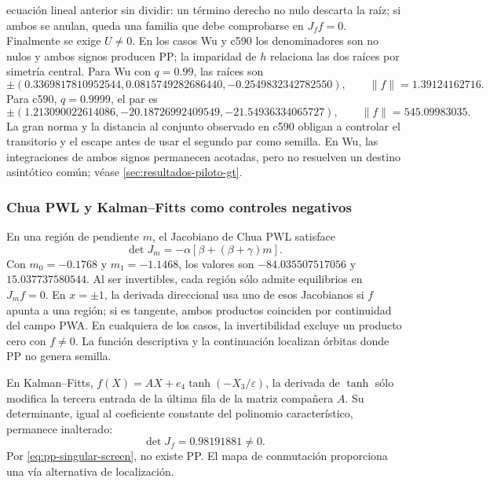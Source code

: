 ecuación lineal anterior sin dividir: un término derecho no nulo descarta
la raíz; si ambos se anulan, queda una familia que debe comprobarse en
\(J_ff=0\). Finalmente se exige \(U\ne0\). En los casos Wu y c590 los
denominadores son no nulos y ambos signos producen PP; la imparidad de
\(h\) relaciona las dos raíces por simetría central.
Para Wu con \(q=0.99\), las raíces son
\begin{equation}
 \pm(0.3369817810952544, 0.0815749282686440,
 -0.2549832342782550),\qquad \|f\|=1.39124162716.
\end{equation}
Para c590, \(q=0.9999\), el par es
\begin{equation}
 \pm(1.213090022614086, -20.18726992409549,
 -21.54936334065727),\qquad \|f\|=545.09983035.
\end{equation}
La gran norma y la distancia al conjunto observado en c590 obligan a
controlar el transitorio y el escape antes de usar el segundo par como
semilla. En Wu, las integraciones de ambos signos permanecen acotadas, pero
no resuelven un destino asintótico común; véase
\cref{sec:resultados-piloto-gt}.

\subsubsection{Chua PWL y Kalman--Fitts como controles negativos}

En una región de pendiente \(m\), el Jacobiano de Chua PWL satisface
\begin{equation}
 \det J_m=-\alpha[\beta+(\beta+\gamma)m].
 \label{eq:pp-chua-pwl-det}
\end{equation}
Con \(m_0=-0.1768\) y \(m_1=-1.1468\), los valores son
\(-84.035507517056\) y \(15.037737580544\). Al ser invertibles, cada región
sólo admite equilibrios en \(J_mf=0\). En \(x=\pm1\), la derivada
direccional usa uno de esos Jacobianos si \(f\) apunta a una región;
si es tangente, ambos productos coinciden por continuidad del campo PWA.
En cualquiera de los casos, la invertibilidad excluye un producto cero
con \(f\ne0\). La función descriptiva y la
continuación localizan órbitas donde PP no genera semilla.

En Kalman--Fitts, \(f(X)=AX+e_4\tanh(-X_3/\varepsilon)\), la
derivada de \(\tanh\) sólo modifica la tercera entrada de la última
fila de la matriz compañera \(A\). Su determinante, igual al coeficiente
constante del polinomio característico, permanece inalterado:
\begin{equation}
 \det J_f=0.98191881\neq0.
\end{equation}
Por \cref{eq:pp-singular-screen}, no existe PP. El mapa de conmutación
proporciona una vía alternativa de localización.

